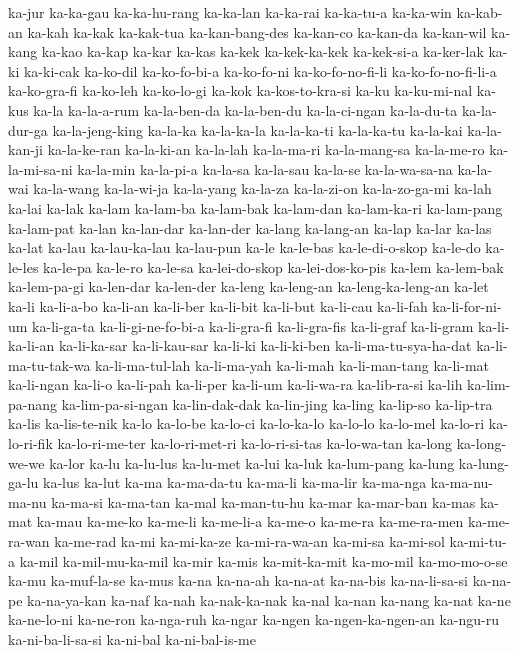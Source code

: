 {ka-jur ka-ka-gau ka-ka-hu-rang ka-ka-lan ka-ka-rai ka-ka-tu-a ka-ka-win
ka-kab-an ka-kah ka-kak ka-kak-tua ka-kan-bang-des ka-kan-co ka-kan-da
ka-kan-wil ka-kang ka-kao ka-kap ka-kar ka-kas ka-kek ka-kek-ka-kek
ka-kek-si-a ka-ker-lak ka-ki ka-ki-cak ka-ko-dil ka-ko-fo-bi-a ka-ko-fo-ni
ka-ko-fo-no-fi-li ka-ko-fo-no-fi-li-a ka-ko-gra-fi ka-ko-leh ka-ko-lo-gi
ka-kok ka-kos-to-kra-si ka-ku ka-ku-mi-nal ka-kus ka-la ka-la-a-rum
ka-la-ben-da ka-la-ben-du ka-la-ci-ngan ka-la-du-ta ka-la-dur-ga
ka-la-jeng-king ka-la-ka ka-la-ka-la ka-la-ka-ti ka-la-ka-tu ka-la-kai
ka-la-kan-ji ka-la-ke-ran ka-la-ki-an ka-la-lah ka-la-ma-ri ka-la-mang-sa
ka-la-me-ro ka-la-mi-sa-ni ka-la-min ka-la-pi-a ka-la-sa ka-la-sau
ka-la-se ka-la-wa-sa-na ka-la-wai ka-la-wang ka-la-wi-ja ka-la-yang
ka-la-za ka-la-zi-on ka-la-zo-ga-mi ka-lah ka-lai ka-lak ka-lam ka-lam-ba
ka-lam-bak ka-lam-dan ka-lam-ka-ri ka-lam-pang ka-lam-pat ka-lan
ka-lan-dar ka-lan-der ka-lang ka-lang-an ka-lap ka-lar ka-las ka-lat
ka-lau ka-lau-ka-lau ka-lau-pun ka-le ka-le-bas ka-le-di-o-skop ka-le-do
ka-le-les ka-le-pa ka-le-ro ka-le-sa ka-lei-do-skop ka-lei-dos-ko-pis
ka-lem ka-lem-bak ka-lem-pa-gi ka-len-dar ka-len-der ka-leng ka-leng-an
ka-leng-ka-leng-an ka-let ka-li ka-li-a-bo ka-li-an ka-li-ber ka-li-bit
ka-li-but ka-li-cau ka-li-fah ka-li-for-ni-um ka-li-ga-ta
ka-li-gi-ne-fo-bi-a ka-li-gra-fi ka-li-gra-fis ka-li-graf ka-li-gram
ka-li-ka-li-an ka-li-ka-sar ka-li-kau-sar ka-li-ki ka-li-ki-ben
ka-li-ma-tu-sya-ha-dat ka-li-ma-tu-tak-wa ka-li-ma-tul-lah ka-li-ma-yah
ka-li-mah ka-li-man-tang ka-li-mat ka-li-ngan ka-li-o ka-li-pah ka-li-per
ka-li-um ka-li-wa-ra ka-lib-ra-si ka-lih ka-lim-pa-nang ka-lim-pa-si-ngan
ka-lin-dak-dak ka-lin-jing ka-ling ka-lip-so ka-lip-tra ka-lis
ka-lis-te-nik ka-lo ka-lo-be ka-lo-ci ka-lo-ka-lo ka-lo-lo ka-lo-mel
ka-lo-ri ka-lo-ri-fik ka-lo-ri-me-ter ka-lo-ri-met-ri ka-lo-ri-si-tas
ka-lo-wa-tan ka-long ka-long-we-we ka-lor ka-lu ka-lu-lus ka-lu-met ka-lui
ka-luk ka-lum-pang ka-lung ka-lung-ga-lu ka-lus ka-lut ka-ma ka-ma-da-tu
ka-ma-li ka-ma-lir ka-ma-nga ka-ma-nu-ma-nu ka-ma-si ka-ma-tan ka-mal
ka-man-tu-hu ka-mar ka-mar-ban ka-mas ka-mat ka-mau ka-me-ko ka-me-li
ka-me-li-a ka-me-o ka-me-ra ka-me-ra-men ka-me-ra-wan ka-me-rad ka-mi
ka-mi-ka-ze ka-mi-ra-wa-an ka-mi-sa ka-mi-sol ka-mi-tu-a ka-mil
ka-mil-mu-ka-mil ka-mir ka-mis ka-mit-ka-mit ka-mo-mil ka-mo-mo-o-se ka-mu
ka-muf-la-se ka-mus ka-na ka-na-ah ka-na-at ka-na-bis ka-na-li-sa-si
ka-na-pe ka-na-ya-kan ka-naf ka-nah ka-nak-ka-nak ka-nal ka-nan ka-nang
ka-nat ka-ne ka-ne-lo-ni ka-ne-ron ka-nga-ruh ka-ngar ka-ngen
ka-ngen-ka-ngen-an ka-ngu-ru ka-ni-ba-li-sa-si ka-ni-bal ka-ni-bal-is-me
}
